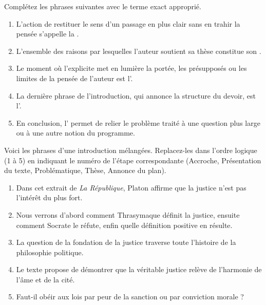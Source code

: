 \documentclass[11pt]{article}
\begin{document}
\begin{exercice}
Complétez les phrases suivantes avec le terme exact approprié.
\begin{enumerate}
    \item L'action de restituer le sens d'un passage \og en plus clair \fg{} sans en trahir la pensée s'appelle la \underline{\hspace{4cm}}.
    \item L'ensemble des raisons par lesquelles l'auteur soutient sa thèse constitue son \underline{\hspace{4cm}}.
    \item Le moment où l'explicite met en lumière la portée, les présupposés ou les limites de la pensée de l'auteur est l'\underline{\hspace{4cm}}.
    \item La dernière phrase de l'introduction, qui annonce la structure du devoir, est l'\underline{\hspace{4cm}}.
    \item En conclusion, l'\underline{\hspace{4cm}} permet de relier le problème traité à une question plus large ou à une autre notion du programme.
\end{enumerate}
\end{exercice}

\begin{exercice}
Voici les phrases d'une introduction mélangées. Replacez-les dans l'ordre logique (1 à 5) en indiquant le numéro de l'étape correspondante (Accroche, Présentation du texte, Problématique, Thèse, Annonce du plan).
\begin{enumerate}
    \item \og Dans cet extrait de \textit{La République}, Platon affirme que la justice n'est pas l'intérêt du plus fort. \fg
    \item \og Nous verrons d'abord comment Thrasymaque définit la justice, ensuite comment Socrate le réfute, enfin quelle définition positive en résulte. \fg
    \item \og La question de la fondation de la justice traverse toute l'histoire de la philosophie politique. \fg
    \item \og Le texte propose de démontrer que la véritable justice relève de l'harmonie de l'âme et de la cité. \fg
    \item \og Faut-il obéir aux lois par peur de la sanction ou par conviction morale ? \fg
\end{enumerate}
\end{exercice}
\end{document}
